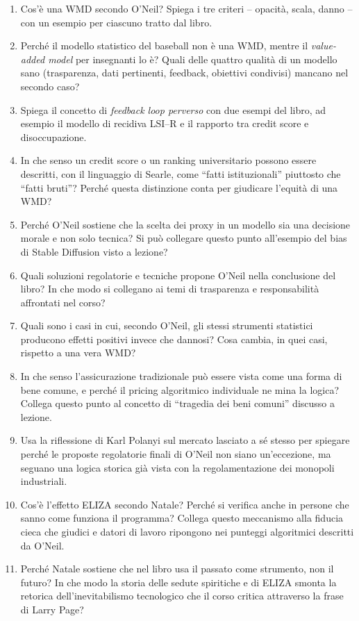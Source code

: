\documentclass[a4paper,11pt]{article}
\begin{document}
\begin{enumerate}
  \item Cos'è una WMD secondo O'Neil? Spiega i tre criteri -- opacità, scala, danno -- con un esempio per ciascuno tratto dal libro.
  \item Perché il modello statistico del baseball non è una WMD, mentre il \emph{value-added model} per insegnanti lo è? Quali delle quattro qualità di un modello sano (trasparenza, dati pertinenti, feedback, obiettivi condivisi) mancano nel secondo caso?
  \item Spiega il concetto di \emph{feedback loop perverso} con due esempi del libro, ad esempio il modello di recidiva LSI--R e il rapporto tra credit score e disoccupazione.
  \item In che senso un credit score o un ranking universitario possono essere descritti, con il linguaggio di Searle, come ``fatti istituzionali'' piuttosto che ``fatti bruti''? Perché questa distinzione conta per giudicare l'equità di una WMD?
  \item Perché O'Neil sostiene che la scelta dei proxy in un modello sia una decisione morale e non solo tecnica? Si può collegare questo punto all'esempio del bias di Stable Diffusion visto a lezione?
  \item Quali soluzioni regolatorie e tecniche propone O'Neil nella conclusione del libro? In che modo si collegano ai temi di trasparenza e responsabilità affrontati nel corso?
  \item Quali sono i casi in cui, secondo O'Neil, gli stessi strumenti statistici producono effetti positivi invece che dannosi? Cosa cambia, in quei casi, rispetto a una vera WMD?
  \item In che senso l'assicurazione tradizionale può essere vista come una forma di bene comune, e perché il pricing algoritmico individuale ne mina la logica? Collega questo punto al concetto di ``tragedia dei beni comuni'' discusso a lezione.
  \item Usa la riflessione di Karl Polanyi sul mercato lasciato a sé stesso per spiegare perché le proposte regolatorie finali di O'Neil non siano un'eccezione, ma seguano una logica storica già vista con la regolamentazione dei monopoli industriali.
  \item Cos'è l'effetto ELIZA secondo Natale? Perché si verifica anche in persone che sanno come funziona il programma? Collega questo meccanismo alla fiducia cieca che giudici e datori di lavoro ripongono nei punteggi algoritmici descritti da O'Neil.
  \item Perché Natale sostiene che nel libro usa il passato come strumento, non il futuro? In che modo la storia delle sedute spiritiche e di ELIZA smonta la retorica dell'inevitabilismo tecnologico che il corso critica attraverso la frase di Larry Page?

\end{enumerate}
\end{document}
